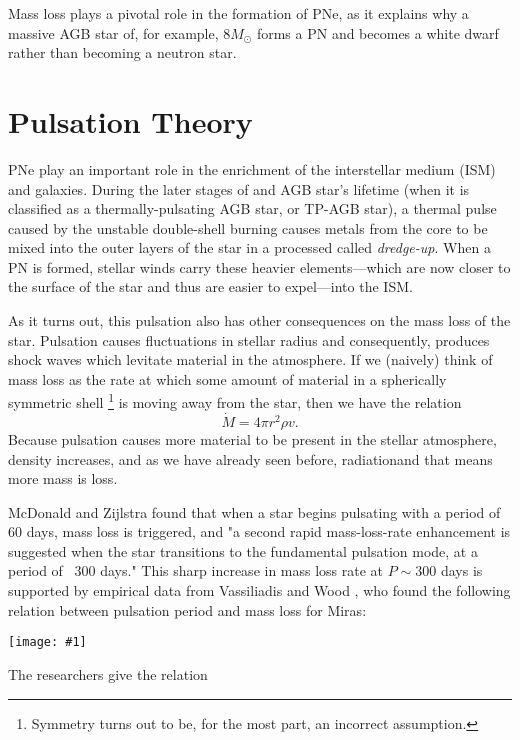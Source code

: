 \documentclass[a4paper,11pt,twocolumn]{article}
\newcommand{\fig}[1]{\centerline{\texttt{[image: \#1]}}}
\begin{document}
Mass loss plays a pivotal role in the formation of PNe, as it explains why a massive AGB star of, for example, $8 M_\odot$ forms a PN and becomes a white dwarf rather than becoming a neutron star. 

\section{Pulsation Theory}

PNe play an important role in the enrichment of the interstellar medium (ISM) and galaxies. During the later stages of and AGB star's lifetime (when it is classified as a thermally-pulsating AGB star, or TP-AGB star), a thermal pulse caused by the unstable double-shell burning causes metals from the core to be mixed into the outer layers of the star in a processed called \textit{dredge-up}. When a PN is formed, stellar winds carry these heavier elements—which are now closer to the surface of the star and thus are easier to expel—into the ISM. \cite{iben} 

As it turns out, this pulsation also has other consequences on the mass loss of the star. Pulsation causes fluctuations in stellar radius and consequently, produces shock waves which levitate material in the atmosphere. If we (naively) think of mass loss as the rate at which some amount of material in a spherically symmetric shell \footnote{Symmetry turns out to be, for the most part, an incorrect assumption.} is moving away from the star, then we have the relation
\begin{equation*}
    \dot M = 4\pi r^2 \rho v.
\end{equation*}
Because pulsation causes more material to be present in the stellar atmosphere, density increases, and as we have already seen before, radiationand that means more mass is loss. 

McDonald and Zijlstra found that when a star begins pulsating with a period of 60 days, mass loss is triggered, and "a second rapid mass-loss-rate enhancement is suggested when the star transitions to the fundamental pulsation mode, at a period of ~300 days."\cite{mcdonald} This sharp increase in mass loss rate at $P\sim 300$ days is supported by empirical data from Vassiliadis and Wood \cite{wood}, who found the following relation between pulsation period and mass loss for Miras:

\fig{pulsation_massloss}




The {\huge researchers} give the relation 
\end{document}
